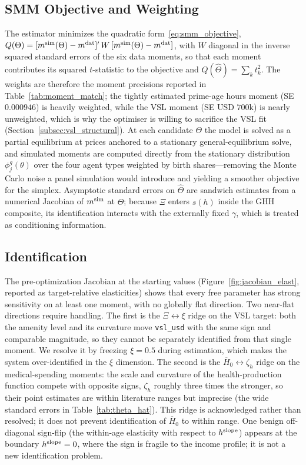 \documentclass[12pt,a4paper]{article}
\begin{document}
\begin{appendices}
\subsection{SMM Objective and Weighting}
\label{app:smm_objective}

The estimator minimizes the quadratic form~\eqref{eq:smm_objective}, $Q(\Theta)=[m^{\rm sim}(\Theta)-m^{\rm dat}]'\,W\,[m^{\rm sim}(\Theta)-m^{\rm dat}]$, with $W$ diagonal in the inverse squared standard errors of the six data moments, so that each moment contributes its squared $t$-statistic to the objective and $Q(\widehat\Theta)=\sum_k t_k^2$. The weights are therefore the moment precisions reported in Table~\ref{tab:moment_match}; the tightly estimated prime-age hours moment (SE $0.000946$) is heavily weighted, while the VSL moment (SE USD $700$k) is nearly unweighted, which is why the optimiser is willing to sacrifice the VSL fit (Section~\ref{subsec:vsl_structural}). At each candidate $\Theta$ the model is solved as a partial equilibrium at prices anchored to a stationary general-equilibrium solve, and simulated moments are computed directly from the stationary distribution $\phi^g_j(\theta)$ over the four agent types weighted by birth shares---removing the Monte Carlo noise a panel simulation would introduce and yielding a smoother objective for the simplex. Asymptotic standard errors on $\widehat\Theta$ are sandwich estimates from a numerical Jacobian of $m^{\rm sim}$ at $\widehat\Theta$; because $\Xi$ enters $s(h)$ inside the GHH composite, its identification interacts with the externally fixed $\gamma$, which is treated as conditioning information.

\subsection{Identification}
\label{app:identification}

The pre-optimization Jacobian at the starting values (Figure~\ref{fig:jacobian_elast}, reported as target-relative elasticities) shows that every free parameter has strong sensitivity on at least one moment, with no globally flat direction. Two near-flat directions require handling. The first is the $\Xi\leftrightarrow\xi$ ridge on the VSL target: both the amenity level and its curvature move \texttt{vsl\_usd} with the same sign and comparable magnitude, so they cannot be separately identified from that single moment. We resolve it by freezing $\xi=0.5$ during estimation, which makes the system over-identified in the $\xi$ dimension. The second is the $\overline{H}_0\leftrightarrow\zeta_h$ ridge on the medical-spending moments: the scale and curvature of the health-production function compete with opposite signs, $\zeta_h$ roughly three times the stronger, so their point estimates are within literature ranges but imprecise (the wide standard errors in Table~\ref{tab:theta_hat}). This ridge is acknowledged rather than resolved; it does not prevent identification of $\overline{H}_0$ to within range. One benign off-diagonal sign-flip (the within-age elasticity with respect to $h^{\rm slope}$) appears at the boundary $h^{\rm slope}=0$, where the sign is fragile to the income profile; it is not a new identification problem.


\end{appendices}
\end{document}
